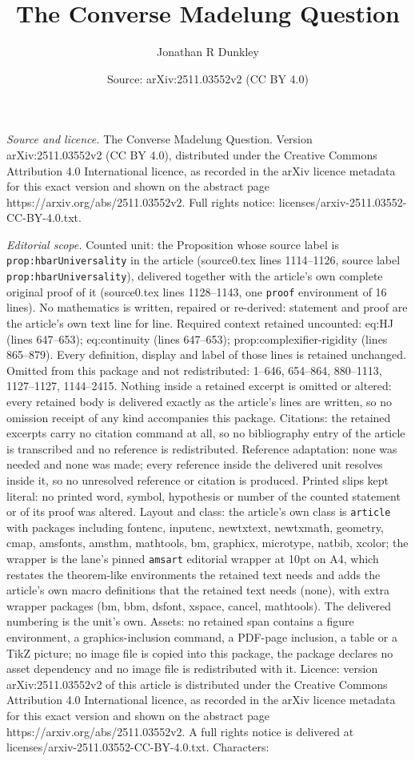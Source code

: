 \documentclass[10pt,a4paper]{amsart}
\title[The Converse Madelung Question]{The Converse Madelung Question}
\author{Jonathan R Dunkley}
\date{Source: arXiv:2511.03552v2 (CC BY 4.0)}
\begin{document}
\maketitle

\noindent\emph{Source and licence.} The Converse Madelung Question. Version arXiv:2511.03552v2 (CC BY 4.0), distributed under the Creative Commons Attribution 4.0 International licence, as recorded in the arXiv licence metadata for this exact version and shown on the abstract page https://arxiv.org/abs/2511.03552v2. Full rights notice: licenses/arxiv-2511.03552-CC-BY-4.0.txt.\par\smallskip

\noindent\textit{Editorial scope.} Counted unit: the Proposition whose source label is \texttt{prop:hbarUniversality} in the article (source0.tex lines 1114--1126, source label \texttt{prop:hbarUniversality}), delivered together with the article's own complete original proof of it (source0.tex lines 1128--1143, one \texttt{proof} environment of 16 lines). No mathematics is written, repaired or re-derived: statement and proof are the article's own text line for line. Required context retained uncounted: eq:HJ (lines 647--653); eq:continuity (lines 647--653); prop:complexifier-rigidity (lines 865--879). Every definition, display and label of those lines is retained unchanged. Omitted from this package and not redistributed: 1--646, 654--864, 880--1113, 1127--1127, 1144--2415. Nothing inside a retained excerpt is omitted or altered: every retained body is delivered exactly as the article's lines are written, so no omission receipt of any kind accompanies this package. Citations: the retained excerpts carry no citation command at all, so no bibliography entry of the article is transcribed and no reference is redistributed. Reference adaptation: none was needed and none was made; every reference inside the delivered unit resolves inside it, so no unresolved reference or citation is produced. Printed slips kept literal: no printed word, symbol, hypothesis or number of the counted statement or of its proof was altered. Layout and class: the article's own class is \texttt{article} with packages including fontenc, inputenc, newtxtext, newtxmath, geometry, cmap, amsfonts, amsthm, mathtools, bm, graphicx, microtype, natbib, xcolor; the wrapper is the lane's pinned \texttt{amsart} editorial wrapper at 10pt on A4, which restates the theorem-like environments the retained text needs and adds the article's own macro definitions that the retained text needs (none), with extra wrapper packages (bm, bbm, dsfont, xspace, cancel, mathtools). The delivered numbering is the unit's own. Assets: no retained span contains a figure environment, a graphics-inclusion command, a PDF-page inclusion, a table or a TikZ picture; no image file is copied into this package, the package declares no asset dependency and no image file is redistributed with it. Licence: version arXiv:2511.03552v2 of this article is distributed under the Creative Commons Attribution 4.0 International licence, as recorded in the arXiv licence metadata for this exact version and shown on the abstract page https://arxiv.org/abs/2511.03552v2. A full rights notice is delivered at licenses/arxiv-2511.03552-CC-BY-4.0.txt. Characters: 
\end{document}
